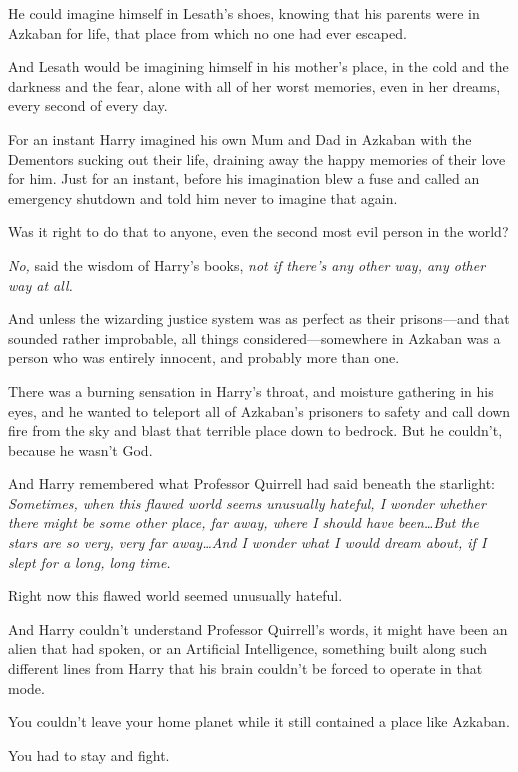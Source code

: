 He could imagine himself in Lesath’s shoes, knowing that his parents were in
Azkaban for life, that place from which no one had ever escaped.

And Lesath would be imagining himself in his mother’s place, in the cold and
the darkness and the fear, alone with all of her worst memories, even in her
dreams, every second of every day.

For an instant Harry imagined his own Mum and Dad in Azkaban with the Dementors
sucking out their life, draining away the happy memories of their love for him.
Just for an instant, before his imagination blew a fuse and called an emergency
shutdown and told him never to imagine that again.

Was it right to do that to anyone, even the second most evil person in the
world?

\emph{No,} said the wisdom of Harry’s books, \emph{not if there’s any other
way, any other way at all.}

And unless the wizarding justice system was as perfect as their prisons—and
that sounded rather improbable, all things considered—somewhere in Azkaban
was a person who was entirely innocent, and probably more than one.

There was a burning sensation in Harry’s throat, and moisture gathering in his
eyes, and he wanted to teleport all of Azkaban’s prisoners to safety and call
down fire from the sky and blast that terrible place down to bedrock. But he
couldn’t, because he wasn’t God.

And Harry remembered what Professor Quirrell had said beneath the starlight:
\emph{Sometimes, when this flawed world seems unusually hateful, I wonder
whether there might be some other place, far away, where I should have
been…But the stars are so very, very far away…And I wonder what
I would dream about, if I slept for a long, long time.}

Right now this flawed world seemed unusually hateful.

And Harry couldn’t understand Professor Quirrell’s words, it might have been an
alien that had spoken, or an Artificial Intelligence, something built along
such different lines from Harry that his brain couldn’t be forced to operate in
that mode.

You couldn’t leave your home planet while it still contained a place like
Azkaban.

You had to stay and fight.
